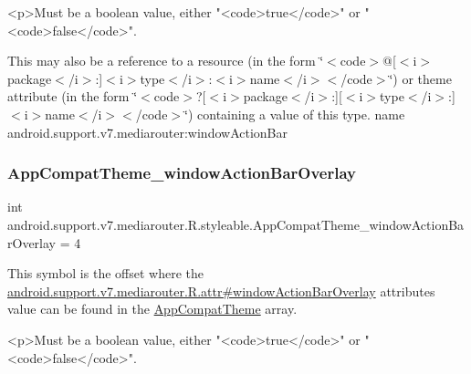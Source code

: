 \begin{DoxyVerb}      <p>Must be a boolean value, either "<code>true</code>" or "<code>false</code>".
\end{DoxyVerb}
 

This may also be a reference to a resource (in the form \char`\"{}$<$code$>$@\mbox{[}$<$i$>$package$<$/i$>$\+:\mbox{]}$<$i$>$type$<$/i$>$\+:$<$i$>$name$<$/i$>$$<$/code$>$\char`\"{}) or theme attribute (in the form \char`\"{}$<$code$>$?\mbox{[}$<$i$>$package$<$/i$>$\+:\mbox{]}\mbox{[}$<$i$>$type$<$/i$>$\+:\mbox{]}$<$i$>$name$<$/i$>$$<$/code$>$\char`\"{}) containing a value of this type.  name android.\+support.\+v7.\+mediarouter\+:window\+Action\+Bar \mbox{\label{classandroid_1_1support_1_1v7_1_1mediarouter_1_1R_1_1styleable_a3ed10a138c0c8928988e19b890aec7f7}} 
\subsubsection{\texorpdfstring{App\+Compat\+Theme\+\_\+window\+Action\+Bar\+Overlay}{AppCompatTheme\_windowActionBarOverlay}}
{\footnotesize\ttfamily int android.\+support.\+v7.\+mediarouter.\+R.\+styleable.\+App\+Compat\+Theme\+\_\+window\+Action\+Bar\+Overlay = 4\hspace{0.3cm}{\ttfamily [static]}}

This symbol is the offset where the \hyperlink{classandroid_1_1support_1_1v7_1_1mediarouter_1_1R_1_1attr_a3c1ca004f5390eccb164cfda9f9392f8}{android.\+support.\+v7.\+mediarouter.\+R.\+attr\#window\+Action\+Bar\+Overlay} attribute\textquotesingle{}s value can be found in the \hyperlink{classandroid_1_1support_1_1v7_1_1mediarouter_1_1R_1_1styleable_a4e3d3900c75d49aeb2f283cac00214d6}{App\+Compat\+Theme} array.

\begin{DoxyVerb}      <p>Must be a boolean value, either "<code>true</code>" or "<code>false</code>".
\end{DoxyVerb}
 

